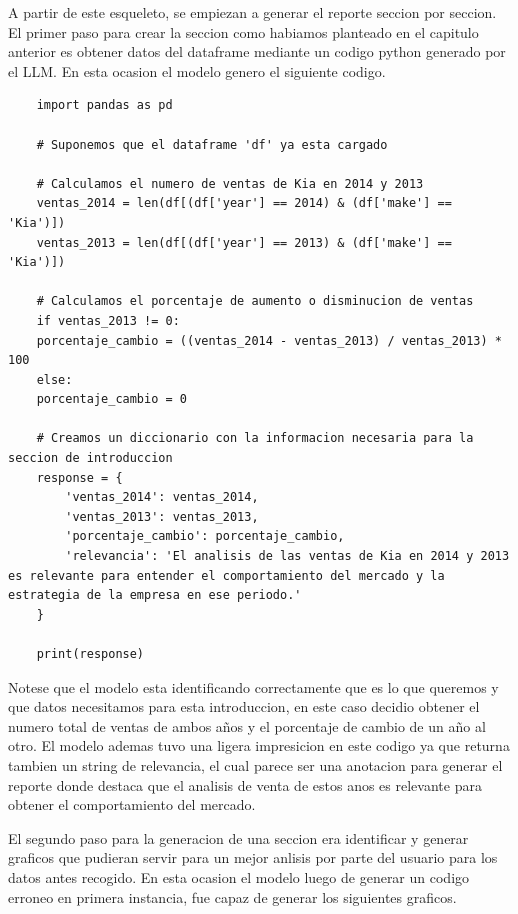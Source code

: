 A partir de este esqueleto, se empiezan a generar el reporte seccion por seccion. El primer paso para crear la seccion como habiamos planteado en el capitulo anterior es obtener datos del dataframe mediante un codigo python generado por el LLM. En esta ocasion el modelo genero el siguiente codigo.


\begin{lstlisting}
	import pandas as pd
	
	# Suponemos que el dataframe 'df' ya esta cargado
	
	# Calculamos el numero de ventas de Kia en 2014 y 2013
	ventas_2014 = len(df[(df['year'] == 2014) & (df['make'] == 'Kia')])
	ventas_2013 = len(df[(df['year'] == 2013) & (df['make'] == 'Kia')])
	
	# Calculamos el porcentaje de aumento o disminucion de ventas
	if ventas_2013 != 0:
	porcentaje_cambio = ((ventas_2014 - ventas_2013) / ventas_2013) * 100
	else:
	porcentaje_cambio = 0
	
	# Creamos un diccionario con la informacion necesaria para la seccion de introduccion
	response = {
		'ventas_2014': ventas_2014,
		'ventas_2013': ventas_2013,
		'porcentaje_cambio': porcentaje_cambio,
		'relevancia': 'El analisis de las ventas de Kia en 2014 y 2013 es relevante para entender el comportamiento del mercado y la estrategia de la empresa en ese periodo.'
	}
	
	print(response)
\end{lstlisting}

Notese que el modelo esta identificando correctamente que es lo que queremos y que datos necesitamos para esta introduccion, en este caso decidio obtener el numero total de ventas de ambos años y el porcentaje de cambio de un año al otro. El modelo ademas tuvo una ligera impresicion en este codigo ya que returna tambien un string de relevancia, el  cual parece ser una anotacion para generar el reporte donde destaca que el analisis de venta de estos anos es relevante para obtener el comportamiento del mercado.

El segundo paso para la generacion de una seccion era identificar y generar graficos que pudieran servir para un mejor anlisis por parte del usuario para los datos antes recogido. En esta ocasion el modelo luego de generar un codigo erroneo en primera instancia, fue capaz de generar los siguientes graficos.

